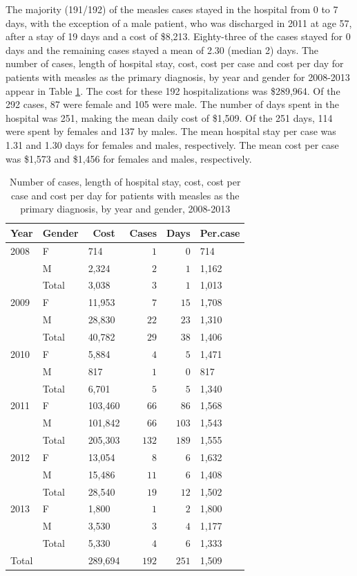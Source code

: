 \documentclass{article}
\begin{document}
The majority (191/192) of the measles cases stayed in the hospital from 0 to 7 days, with the exception of a male patient, who was discharged in 2011 at age 57, after a stay of 19 days and a cost of \$8,213. Eighty-three of the cases stayed for 0 days and the remaining cases stayed a mean of 2.30 (median 2) days.
The number of cases, length of hospital stay, cost, cost per case and cost per day for patients with measles as the primary diagnosis, by year and gender for 2008-2013 appear in Table \ref{table:cases}. The cost for these 192 hospitalizations was \$289,964. Of the 292 cases, 87 were female and 105 were male. The number of days spent in the hospital was 251, making the mean daily cost of \$1,509. Of the 251 days, 114 were spent by females and 137 by males. The mean hospital stay per case was 1.31 and 1.30 days for females and males, respectively. The mean cost per case was \$1,573 and \$1,456 for females and males, respectively.


\begin{table}
\caption{Number of cases, length of hospital stay, cost, cost per case and cost per day for patients with measles as the primary diagnosis, by year and gender, 2008-2013}
\begin{center}
\begin{tabular}{lllrrl}
\hline\hline
\multicolumn{1}{c}{Year}&\multicolumn{1}{c}{Gender}&\multicolumn{1}{c}{Cost}&\multicolumn{1}{c}{Cases}&\multicolumn{1}{c}{Days}&\multicolumn{1}{c}{Per.case}\tabularnewline
\hline
2008&F&714&$  1$&$  0$&714\tabularnewline
&M&2,324&$  2$&$  1$&1,162\tabularnewline
                    &Total&3,038&$  3$&$  1$&1,013\tabularnewline
2009&F&11,953&$  7$&$ 15$&1,708\tabularnewline
&M&28,830&$ 22$&$ 23$&1,310\tabularnewline
                    &Total&40,782&$ 29$&$ 38$&1,406\tabularnewline
2010&F&5,884&$  4$&$  5$&1,471\tabularnewline
&M&817&$  1$&$  0$&817\tabularnewline
                    &Total&6,701&$  5$&$  5$&1,340\tabularnewline
2011&F&103,460&$ 66$&$ 86$&1,568\tabularnewline
&M&101,842&$ 66$&$103$&1,543\tabularnewline
                    &Total&205,303&$132$&$189$&1,555\tabularnewline
2012&F&13,054&$  8$&$  6$&1,632\tabularnewline
&M&15,486&$ 11$&$  6$&1,408\tabularnewline
                    &Total&28,540&$ 19$&$ 12$&1,502\tabularnewline
2013&F&1,800&$  1$&$  2$&1,800\tabularnewline
&M&3,530&$  3$&$  4$&1,177\tabularnewline
                    &Total&5,330&$  4$&$  6$&1,333\tabularnewline
Total&&289,694&$192$&$251$&1,509\tabularnewline
\hline
\end{tabular}\end{center}\label{table:cases}
\end{table}
\end{document}
